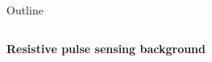 \begin{frame}[c]{Outline}
\begin{columns}[t]
\begin{column}[T]{2.25in}
			
			


			
			
		\end{column}
		
	\end{columns}

	
	
	
	
	
\end{frame}




\begin{frame}[c]{}
	\begin{center}
		\textbf{Resistive pulse sensing background}
	\end{center}
\end{frame}





